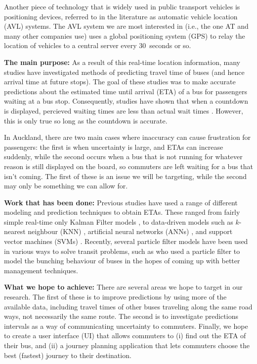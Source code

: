 \documentclass[12pt,a4paper]{article}
\begin{document}
Another piece of technology that is widely used in public transport vehicles is positioning devices,
referred to in the literature as automatic vehicle location (AVL) systems.
The AVL system we are most interested in (i.e., the one AT and many other companies use) 
uses a global positioning system (GPS) to relay the location of vehicles to a central server
every 30~seconds or so.

\textbf{The main purpose:}
As a result of this real-time location information, many studies have investigated methods of
predicting travel time of buses (and hence arrival time at future stops).
The goal of these studies was to make accurate predictions about the estimated time until arrival (ETA) 
of a bus for passengers waiting at a bus stop.
Consequently, studies have shown that when a countdown is displayed, percieved waiting times are less 
than actual wait times \citep{cn}.
However, this is only true so long as the countdown is accurate.

In Auckland, there are two main cases where inaccuracy can cause frustration for passengers:
the first is when uncertainty is large, and ETAs can increase suddenly, 
while the second occurs when a bus that is not running for whatever reason is still displayed 
on the board, so commuters are left waiting for a bus that isn't coming.
The first of these is an issue we will be targeting, while the second may only be something we can allow for.


\textbf{Work that has been done:}
Previous studies have used a range of different modeling and prediction techniques to obtain ETAs.
These ranged from fairly simple real-time only Kalman Filter models \citep{cn}, 
to data-driven models such as 
$k$-nearest neighbour (KNN) \citep{cn}, 
artificial neural networks (ANNs) \citep{cn}, 
and support vector machines (SVMs) \citep{cn}.
Recently, several particle filter models have been used in various ways to solve transit problems,
such as \cite{hans-etal:2015} who used a particle filter to model the bunching behaviour of buses
in the hopes of coming up with better management techniques.



\textbf{What we hope to achieve:}
There are several areas we hope to target in our research.
The first of these is to improve predictions by using more of the available data,
including travel times of other buses traveling along the same road ways, 
not necessarily the same route.
The second is to investigate predictions intervals as a way of communicating uncertainty to commuters.
Finally, we hope to create a user interface (UI) that allows commuters to (i) find out the ETA of their bus,
and (ii) a journey planning application that lets commuters choose the best (fastest) journey to their destination.
\end{document}
